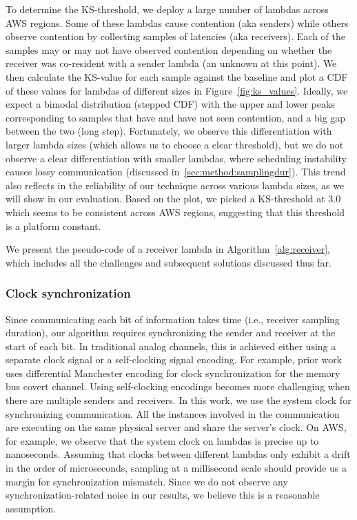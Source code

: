 To determine the KS-threshold, we deploy a large number of lambdas across AWS
regions. Some of these lambdas cause contention (aka senders) while others
observe contention by collecting samples of latencies (aka receivers). Each of
the samples may or may not have observed contention depending on whether the
receiver was co-resident with a sender lambda (an unknown at this point). We then
calculate the KS-value for each sample against the baseline and plot a CDF of
these values for lambdas of different sizes in Figure~\ref{fig:ks_values}.
Ideally, we expect a bimodal distribution (stepped CDF) with the upper and
lower peaks corresponding to samples that have and have not seen contention, and
a big gap between the two (long step). Fortunately, we observe this
differentiation with larger lambda sizes (which allows us to choose a clear
threshold), but we do not observe a clear differentiation with smaller lambdas,
where scheduling instability causes lossy communication (discussed
in~\ref{sec:method:samplingdur}).  This trend also reflects in the reliability
of our technique across various lambda sizes, as we will show in our evaluation.
Based on the plot, we picked a KS-threshold at 3.0 which seems to be consistent
across AWS regions, suggesting that this threshold is a platform constant.

We present the pseudo-code of a receiver lambda in Algorithm~\ref{alg:receiver},
which includes all the challenges and subsequent solutions discussed thus
far.

\subsubsection{Clock synchronization} 
Since communicating each bit of information takes time (i.e., receiver sampling
duration), our algorithm requires synchronizing the sender and receiver at the start
of each bit. In traditional analog channels, this is achieved either using a
separate clock signal or a self-clocking signal encoding. For example, prior
work~\cite{wuusenix2012} uses differential Manchester encoding for clock
synchronization for the memory bus covert channel. Using self-clocking encodings
becomes more challenging when there are multiple senders and receivers. In this
work, we use the system clock for synchronizing communication.  All the
instances involved in the communication are executing on the same physical
server and share the server's clock. On AWS, for example, we observe that the
system clock on lambdas is precise up to nanoseconds. 
Assuming that clocks between different lambdas only exhibit a drift in the order
of microseconds, sampling at a millisecond scale should provide us a margin for
synchronization mismatch. Since we do not observe any synchronization-related
noise in our results, we believe this is a reasonable assumption.



